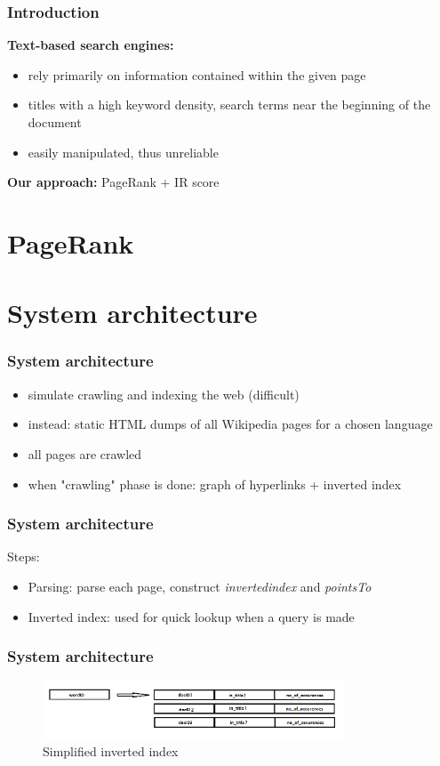 \documentclass[10pt]{beamer}
\begin{document}
\begin{frame}
\frametitle{Introduction}
\textbf{Text-based search engines:}
\begin{itemize}
\item rely primarily on information contained within the given page
\item titles with a high keyword density, search terms near the beginning of the document
\item easily manipulated, thus unreliable

\end{itemize}

\textbf{Our approach:} PageRank + IR score
\end{frame}



\section{PageRank}


\section{System architecture}


\begin{frame}
\frametitle{System architecture}

\begin{itemize}
\item simulate crawling and indexing the web (difficult)
\item instead: static HTML dumps of all Wikipedia pages for a chosen language
\item all pages are crawled
\item when "crawling" phase is done: graph of hyperlinks + inverted index
\end{itemize}
\end{frame}

\begin{frame}
\frametitle{System architecture}

Steps:

\begin{itemize}
\item Parsing: parse each page, construct \emph{invertedindex} and \emph{pointsTo}
\item Inverted index: used for quick lookup when a query is made
\end{itemize}
\end{frame}

\begin{frame}
\frametitle{System architecture}
\begin{figure}[h]
\includegraphics[width=0.8\textwidth]{index.png}
\caption{Simplified inverted index}
\end{figure}
\end{frame}
\end{document}
